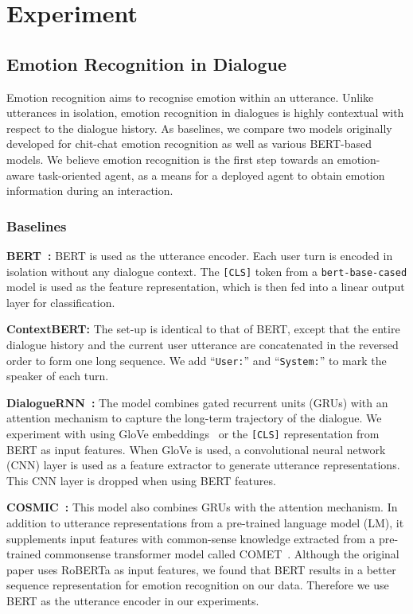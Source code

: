 \documentclass[10pt, a4paper]{article}
\begin{document}
\section{Experiment}
\subsection{Emotion Recognition in Dialogue}

Emotion recognition aims to recognise emotion within an utterance. Unlike utterances in isolation, emotion recognition in dialogues is highly contextual with respect to the dialogue history. As baselines, we compare two models originally developed for chit-chat emotion recognition as well as various BERT-based models. We believe emotion recognition is the first step towards an emotion-aware task-oriented agent, as a means for a deployed agent to obtain emotion information during an interaction.

\subsubsection{Baselines}

\textbf{BERT~\cite{devlin-etal-2019-bert}:} BERT is used as the utterance encoder. Each user turn is encoded in isolation without any dialogue context. The \verb|[CLS]| token from a \verb|bert-base-cased| model is used as the feature representation, which is then fed into a linear output layer for classification.

\textbf{ContextBERT:} The set-up is identical to that of BERT, except that the entire dialogue history and the current user utterance are concatenated in the reversed order to form one long sequence. We add ``\verb|User:|'' and ``\verb|System:|'' to mark the speaker of each turn. 

\textbf{DialogueRNN~\cite{Majumder_Poria_Hazarika_Mihalcea_Gelbukh_Cambria_2019}:} The model combines gated recurrent units (GRUs) with an attention mechanism to capture the long-term trajectory of the dialogue. We experiment with using GloVe embeddings~\cite{pennington-etal-2014-glove} or the \verb|[CLS]| representation from BERT as input features. When GloVe is used, a convolutional neural network (CNN) layer is used as a feature extractor to generate utterance representations. This CNN layer is dropped when using BERT features.

\textbf{COSMIC~\cite{ghosal-etal-2020-cosmic}:} This model also combines GRUs with the attention mechanism. In addition to utterance representations from a pre-trained language model (LM), it supplements input features with common-sense knowledge extracted from a pre-trained commonsense transformer model called COMET~\cite{bosselut-etal-2019-comet}. Although the original paper uses RoBERTa as input features, we found that BERT results in a better sequence representation for emotion recognition on our data. Therefore we use BERT as the utterance encoder in our experiments.
\end{document}
